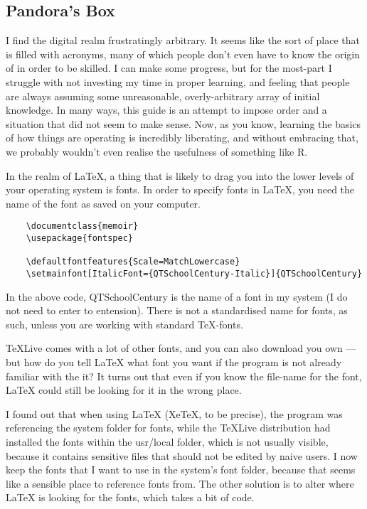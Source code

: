 \documentclass[11pt, oneside]{memoir}
\begin{document}
\subsection{Pandora's Box}
I find the digital realm frustratingly arbitrary. It seems like the sort of place that is filled with acronyms, many of which people don't even have to know the origin of in order to be skilled. I can make some progress, but for the most-part I struggle with not investing my time in proper learning, and feeling that people are always assuming some unreasonable, overly-arbitrary array of initial knowledge. In many ways, this guide is an attempt to impose order and a situation that did not seem to make sense. Now, as you know, learning the basics of how things are operating is incredibly liberating, and without embracing that, we probably wouldn't even realise the usefulness of something like R. 

In the realm of LaTeX, a thing that is likely to drag you into the lower levels of your operating system is fonts. In order to specify fonts in LaTeX, you need the name of the font as saved on your computer. 

\begin{verbatim}
    \documentclass{memoir}
    \usepackage{fontspec}
    
    \defaultfontfeatures{Scale=MatchLowercase}
    \setmainfont[ItalicFont={QTSchoolCentury-Italic}]{QTSchoolCentury}
\end{verbatim}

In the above code, QTSchoolCentury is the name of a font in my system (I do not need to enter to entension).
There is not a standardised name for fonts, as such, unless you are working with standard TeX-fonts.

TeXLive comes with a lot of other fonts, and you can also download you own — but how do you tell LaTeX what font you want if the program is not already familiar with the it? It turns out that even if you know the file-name for the font, LaTeX could still be looking for it in the wrong place.

I found out that when using LaTeX (XeTeX, to be precise), the program was referencing the system folder for fonts, while the TeXLive distribution had installed the fonts within the usr/local folder, which is not usually visible, because it contains sensitive files that should not be edited by naive users. I now keep the fonts that I want to use in the system's font folder, because that seems like a sensible place to reference fonts from. The other solution is to alter where LaTeX is looking for the fonts, which takes a bit of code.
\end{document}
